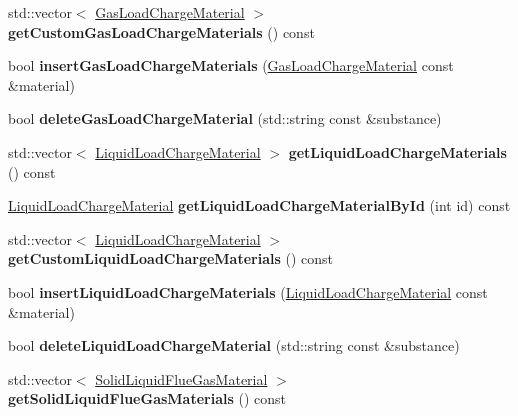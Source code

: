 \begin{DoxyCompactItemize}
std\+::vector$<$ \hyperlink{class_gas_load_charge_material}{Gas\+Load\+Charge\+Material} $>$ {\bfseries get\+Custom\+Gas\+Load\+Charge\+Materials} () const
\item 
\mbox{\label{class_s_q_lite_af482f51c0d3de08fbfa3e537382a567f}} 
bool {\bfseries insert\+Gas\+Load\+Charge\+Materials} (\hyperlink{class_gas_load_charge_material}{Gas\+Load\+Charge\+Material} const \&material)
\item 
\mbox{\label{class_s_q_lite_ac354a72accd5a0d8901da9df19c045d3}} 
bool {\bfseries delete\+Gas\+Load\+Charge\+Material} (std\+::string const \&substance)
\item 
\mbox{\label{class_s_q_lite_a375614ae9d9748646cba88c834796272}} 
std\+::vector$<$ \hyperlink{class_liquid_load_charge_material}{Liquid\+Load\+Charge\+Material} $>$ {\bfseries get\+Liquid\+Load\+Charge\+Materials} () const
\item 
\mbox{\label{class_s_q_lite_a3f31756b0fc49be7123e7146cbb12c70}} 
\hyperlink{class_liquid_load_charge_material}{Liquid\+Load\+Charge\+Material} {\bfseries get\+Liquid\+Load\+Charge\+Material\+By\+Id} (int id) const
\item 
\mbox{\label{class_s_q_lite_aaebe47614c69a50c86a5f585e7b8305c}} 
std\+::vector$<$ \hyperlink{class_liquid_load_charge_material}{Liquid\+Load\+Charge\+Material} $>$ {\bfseries get\+Custom\+Liquid\+Load\+Charge\+Materials} () const
\item 
\mbox{\label{class_s_q_lite_aff9ccdb8af003d3a0a3fdc9a85af77d8}} 
bool {\bfseries insert\+Liquid\+Load\+Charge\+Materials} (\hyperlink{class_liquid_load_charge_material}{Liquid\+Load\+Charge\+Material} const \&material)
\item 
\mbox{\label{class_s_q_lite_a4dbd677be8b79a0f85018fa1bed3c1db}} 
bool {\bfseries delete\+Liquid\+Load\+Charge\+Material} (std\+::string const \&substance)
\item 
\mbox{\label{class_s_q_lite_aeee9b2bce2f489464d7284224a7422c2}} 
std\+::vector$<$ \hyperlink{class_solid_liquid_flue_gas_material}{Solid\+Liquid\+Flue\+Gas\+Material} $>$ {\bfseries get\+Solid\+Liquid\+Flue\+Gas\+Materials} () const

\end{DoxyCompactItemize}

